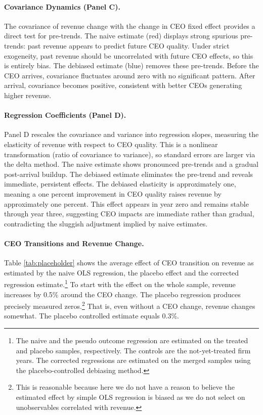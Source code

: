 \documentclass[11pt,a4paper]{article}
\begin{document}
\paragraph{Covariance Dynamics (Panel C).} The covariance of revenue change with the change in CEO fixed effect provides a direct test for pre-trends. The naive estimate (red) displays strong spurious pre-trends: past revenue appears to predict future CEO quality. Under strict exogeneity, past revenue should be uncorrelated with future CEO effects, so this is entirely bias. The debiased estimate (blue) removes these pre-trends. Before the CEO arrives, covariance fluctuates around zero with no significant pattern. After arrival, covariance becomes positive, consistent with better CEOs generating higher revenue.

\paragraph{Regression Coefficients (Panel D).} Panel D rescales the covariance and variance into regression slopes, measuring the elasticity of revenue with respect to CEO quality. This is a nonlinear transformation (ratio of covariance to variance), so standard errors are larger via the delta method. The naive estimate shows pronounced pre-trends and a gradual post-arrival buildup. The debiased estimate eliminates the pre-trend and reveals immediate, persistent effects. The debiased elasticity is approximately one, meaning a one percent improvement in CEO quality raises revenue by approximately one percent. This effect appears in year zero and remains stable through year three, suggesting CEO impacts are immediate rather than gradual, contradicting the sluggish adjustment implied by naive estimates.


\paragraph{CEO Transitions and Revenue Change.} Table \ref{tab:placeholder} shows the average effect of CEO transition on revenue as estimated by the naive OLS regression, the placebo effect and the corrected regression estimate.\footnote{The naive and the pseudo outcome regression are estimated on the treated and placebo samples, respectively. The controls are the not-yet-treated firm years. The corrected regressions are estimated on the merged samples using the placebo-controlled debiasing method.} To start with the effect on the whole sample, revenue increases by 0.5\% around the CEO change. The placebo regression produces precisely measured zeros.\footnote{This is reasonable because here we do not have a reason to believe the estimated effect by simple OLS regression is biased as we do not select on unobservables correlated with revenue.} That is, even without a CEO change, revenue changes somewhat. The placebo controlled estimate equals 0.3\%.
\end{document}
